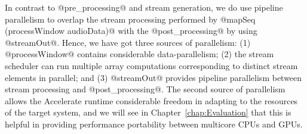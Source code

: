 In contrast to @pre_processing@ and stream generation, we do use pipeline parallelism to overlap the stream processing performed by @mapSeq (processWindow audioData)@ with the @post_processing@ by using @streamOut@. Hence, we have got three sources of parallelism: (1) @processWindow@ contains considerable data-parallelism; (2) the stream scheduler can run multiple array computations corresponding to distinct stream elements in parallel; and (3) @streamOut@ provides pipeline parallelism between stream processing and @post_processing@. The second source of parallelism allows the Accelerate runtime considerable freedom in adapting to the resources of the target system, and we will see in Chapter~\ref{chap:Evaluation} that this is helpful in providing performance portability between multicore CPUs and GPUs.

